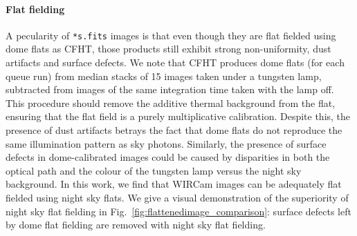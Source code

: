 \documentclass[iop]{emulateapj}
\newcommand{\Fig}[1]{Fig.~\ref{fig:#1}}  %
\begin{document}
\paragraph{Flat fielding} A pecularity of \texttt{*s.fits} images is that even though they are flat fielded using dome flats as CFHT, those products still exhibit strong non-uniformity, dust artifacts and surface defects.
%
%
We note that CFHT produces dome flats (for each queue run) from median stacks of 15 images taken under a tungsten lamp, subtracted from images of the same integration time taken with the lamp off.
This procedure should remove the additive thermal background from the flat, ensuring that the flat field is a purely multiplicative calibration.
Despite this, the presence of dust artifacts betrays the fact that dome flats do not reproduce the same illumination pattern as sky photons.
Similarly, the presence of surface defects in dome-calibrated images could be caused by disparities in both the optical path and the colour of the tungsten lamp versus the night sky background.
In this work, we find that WIRCam images can be adequately flat fielded using night sky flats.
We give a visual demonstration of the superiority of night sky flat fielding in \Fig{flattenedimage_comparison}: surface defects left by dome flat fielding are removed with night sky flat fielding.
\end{document}
